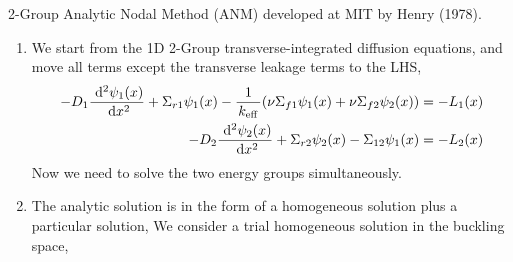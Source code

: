 \documentclass{school-22.211-notes}
\begin{document}
\clearpage
{}
2-Group Analytic Nodal Method (ANM) developed at MIT by Henry (1978). 
  \begin{enumerate}
  \item We start from the 1D 2-Group transverse-integrated diffusion equations, and move all terms except the transverse leakage terms to the LHS, 
    \begin{align}
      -D_1 \frac{\mbox{ }\mathrm{d}^2 \psi_1(x)}{\mbox{ }\mathrm{d} x^2} + \Sigma_{r1} \psi_1(x) - \frac{1}{\left. k_{\mathrm{eff}} \right.} (\nu \Sigma_{f1} \psi_1 (x) + \nu \Sigma_{f2} \psi_2 (x) ) &= - L_1(x) \\
      -D_2 \frac{\mbox{ }\mathrm{d}^2 \psi_2(x)}{\mbox{ }\mathrm{d} x^2} + \Sigma_{r2} \psi_2(x) - \Sigma_{12} \psi_1 (x) &= - L_2 (x) 
    \end{align}
    Now we need to solve the two energy groups simultaneously. 

  \item The analytic solution is in the form of a homogeneous solution plus a particular solution,  
    We consider a trial homogeneous solution in the buckling space, 
   

\end{enumerate}
\end{document}
